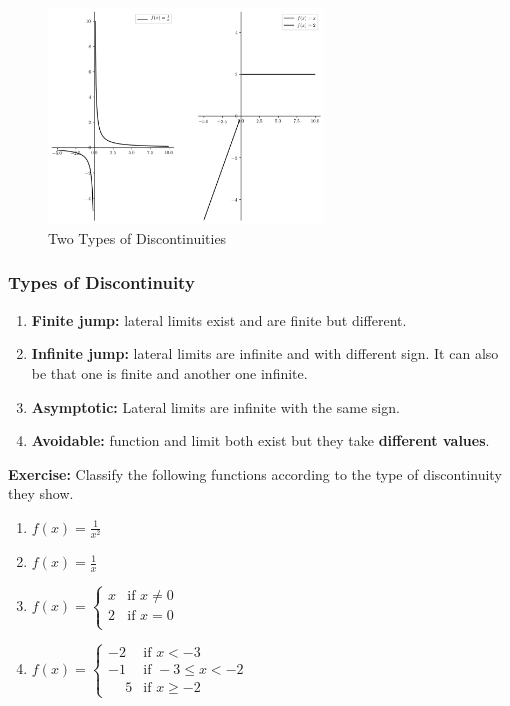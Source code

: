 \documentclass[a4paper,11pt]{article}
\theoremstyle{definition}
\theoremstyle{plain}
\begin{document}
    \begin{figure}[htbp]
    	\centering 
    		\includegraphics[width = 0.65\textwidth]{Ch1_files/Ch1_27_0.png}
    		\caption{Two Types of Discontinuities}
    		\label{fig:discontinuities}
    \end{figure}
    
\subsubsection{Types of Discontinuity}\label{types-of-discontinuity}

\begin{enumerate}
\def\labelenumi{\arabic{enumi}.}
\item
  \textbf{Finite jump:} lateral limits exist and are finite but
  different.
\item
  \textbf{Infinite jump:} lateral limits are infinite and with different
  sign. It can also be that one is finite and another one infinite.
\item
  \textbf{Asymptotic:} Lateral limits are infinite with the same sign.
\item
  \textbf{Avoidable:} function and limit both exist but they take
  \textbf{different values}.
\end{enumerate}

\textbf{Exercise:} Classify the following functions according to the
type of discontinuity they show.

\begin{enumerate}
\def\labelenumi{\arabic{enumi}.}
\item
  \(f(x) = \frac{1}{x^2}\)
\item
  \(f(x) = \frac{1}{x}\)
\item
  \(f(x) = \begin{cases} x & \text{if } x\neq 0 \\ 2 & \text{if } x = 0 \\ \end{cases}\)
\item
  \(f(x) = \begin{cases} -2 & \text{if } x < -3 \\ -1 & \text{if } -3\leq x < -2 \\ \phantom{-}5 & \text{if } x \geq -2 \end{cases}\)
\end{enumerate}
\end{document}
